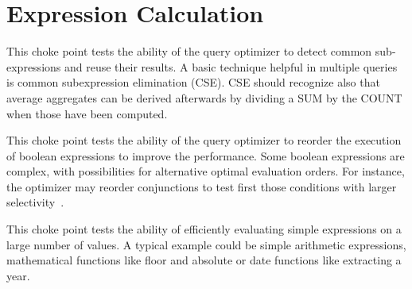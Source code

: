 
\section{Expression Calculation}



This choke point tests the ability of the query optimizer to detect common sub-expressions and reuse their results. A basic technique helpful in multiple queries is common subexpression elimination (CSE).
CSE should recognize also that average aggregates can be derived afterwards by dividing a SUM by the COUNT when those have been computed.





This choke point tests the ability of the query optimizer to reorder the execution of boolean expressions to improve the performance. Some boolean expressions are complex, with possibilities for alternative optimal evaluation orders.
For instance, the optimizer may reorder conjunctions to test first those conditions with larger selectivity~\cite{DBLP:conf/vldb/Moerkotte98}.





This choke point tests the ability of efficiently evaluating simple expressions on a large number of values. A typical example could be simple arithmetic expressions, mathematical functions like floor and absolute or date functions like extracting a year.




